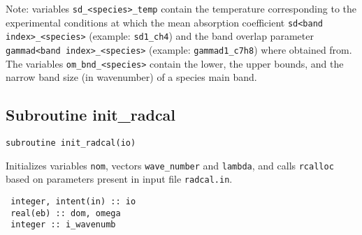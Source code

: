 Note: variables \verb=sd_<species>_temp= contain the temperature corresponding to the experimental conditions at which the mean absorption coefficient \verb=sd<band index>_<species>= (example: \verb=sd1_ch4=) and the band overlap parameter \verb=gammad<band index>_<species>= (example: \verb=gammad1_c7h8=) where obtained from. The variables \verb=om_bnd_<species>= contain the lower, the upper bounds, and the narrow band size (in wavenumber) of a species main band.

\subsection{Subroutine init\_radcal}
\label{sub:init_radcal}
\begin{lstlisting}
subroutine init_radcal(io)
\end{lstlisting}

Initializes variables \verb=nom=, vectors \verb=wave_number= and \verb=lambda=, and calls \verb=rcalloc= based on parameters present in input file \verb=radcal.in=.

\begin{lstlisting}
 integer, intent(in) :: io
 real(eb) :: dom, omega
 integer :: i_wavenumb
\end{lstlisting}


